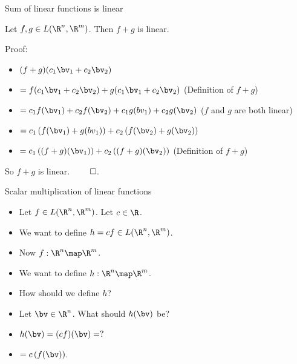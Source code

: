 \documentclass{beamer}
\begin{document}
\begin{frame}{Sum of linear functions is linear}

\begin{lemma}
Let $f,g\in L(\R^n, \R^m)$. Then $f+g$ is linear.
\end{lemma}

\pause

Proof:

\pause

\begin{itemize}
\item $(f+g)(c_1 \bv_1 + c_2 \bv_2)$
\item $=f(c_1 \bv_1 + c_2 \bv_2) + g(c_1 \bv_1 + c_2 \bv_2)$ \quad (Definition of $f+g$)
\item $=c_1f(\bv_1)+ c_2f(\bv_2) + c_1g(bv_1) + c_2g(\bv_2)$ \quad ($f$ and $g$ are both linear)
\item $= c_1\left(f(\bv_1)+  g(bv_1)\right) + c_2\left(f(\bv_2) + g(\bv_2)\right)$
\item $=c_1\left((f + g)(\bv_1)\right) + c_2\left((f+g)(\bv_2) \right)$ \quad (Definition of $f+g$)
\end{itemize}

\pause

So $f+g$ is linear. $\qed$.

\end{frame}

\begin{frame}{Scalar multiplication of linear functions}

\begin{itemize}
\item Let $f \in L(\R^n,\R^m)$. Let $c\in\R$.
\item We want to define $h = c f \in L(\R^n,\R^m)$.
\item Now $f:\R^n\map\R^m$.
\item We want to define $h:\R^n\map\R^m$.
\item How should we define $h$?
\item Let $\bv\in\R^n$. What should $h(\bv)$ be?
\item $h(\bv) = (c f)(\bv) = ?$
\item $= c \left(f (\bv)\right)$.
\end{itemize}

\end{frame}
\end{document}

